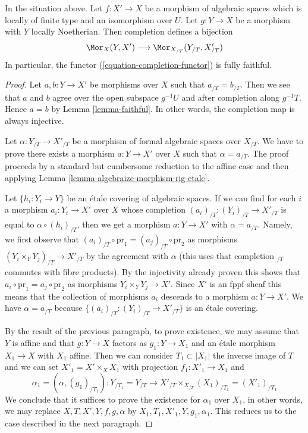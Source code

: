 \begin{lemma}
\label{lemma-completion-functor-fully-faithful}
In the situation above. Let $f : X' \to X$ be a morphism of algebraic spaces
which is locally of finite type and an isomorphism over $U$. Let
$g : Y \to X$ be a morphism with $Y$ locally Noetherian. Then completion
defines a bijection
$$
\Mor_X(Y, X') \longrightarrow \Mor_{X_{/T}}(Y_{/T}, X'_{/T})
$$
In particular, the functor (\ref{equation-completion-functor}) is
fully faithful.
\end{lemma}

\begin{proof}
Let $a, b : Y \to X'$ be morphisms over $X$ such that
$a_{/T} = b_{/T}$. Then we see that $a$ and $b$ agree over the open
subspace $g^{-1}U$ and after completion along $g^{-1}T$.
Hence $a = b$ by Lemma \ref{lemma-faithful}.
In other words, the completion map is always injective.

\medskip\noindent
Let $\alpha : Y_{/T} \to X'_{/T}$ be a morphism of formal algebraic spaces
over $X_{/T}$. We have to prove there exists a morphism $a : Y \to X'$
over $X$ such that $\alpha = a_{/T}$. The proof proceeds by a standard
but cumbersome reduction to the affine case and then applying
Lemma \ref{lemma-algebraize-morphism-rig-etale}.

\medskip\noindent
Let $\{h_i : Y_i \to Y\}$ be an \'etale covering of algebraic spaces.
If we can find for each $i$ a morphism $a_i : Y_i \to X'$ over $X$
whose completion $(a_i)_{/T} : (Y_i)_{/T} \to X'_{/T}$ is equal to
$\alpha \circ (h_i)_{/T}$, then we get a morphism $a : Y \to X'$
with $\alpha = a_{/T}$. Namely, we first observe that
$(a_i)_{/T} \circ \text{pr}_1 = (a_j)_{/T} \circ \text{pr}_2$
as morphisms $(Y_i \times_Y Y_j)_{/T} \to X'_{/T}$ by the
agreement with $\alpha$ (this uses that completion ${}_{/T}$ commutes
with fibre products). By the injectivity already proven this shows that
$a_i \circ \text{pr}_1 = a_j \circ \text{pr}_2$ as morphisms
$Y_i \times_Y Y_j \to X'$. Since $X'$ is an fppf sheaf this means that
the collection of morphisms $a_i$ descends to a morphism $a : Y \to X'$.
We have $\alpha = a_{/T}$ because $\{(a_i)_{/T} : (Y_i)_{/T} \to X'_{/T}\}$
is an \'etale covering.

\medskip\noindent
By the result of the previous paragraph, to prove existence,
we may assume that $Y$ is affine and that $g : Y \to X$ factors
as $g_1 : Y \to X_1$ and an \'etale morphism $X_1 \to X$ with $X_1$ affine.
Then we can consider $T_1 \subset |X_1|$ the inverse image of $T$
and we can set $X'_1 = X' \times_X X_1$ with projection $f_1 : X'_1 \to X_1$
and
$$
\alpha_1 = (\alpha, (g_1)_{/T_1}) :
Y_{/T_1} = Y_{/T}
\longrightarrow
X'_{/T} \times_{X_{/T}} (X_1)_{/T_1} = (X'_1)_{/T_1}
$$
We conclude that it suffices to prove the existence for $\alpha_1$
over $X_1$, in other words, we may replace $X, T, X', Y, f, g, \alpha$
by $X_1, T_1, X'_1, Y, g_1, \alpha_1$.
This reduces us to the case described in the next paragraph.


\end{proof}
